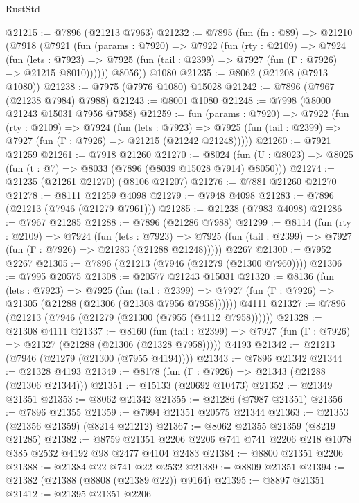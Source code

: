 \begin{lexlean}{RustStd}
\begin{coremodule}
@21215 := @7896 (@21213 @7963)
@21232 := @7895
    (fun (fn : @89) =>
    @21210
      (@7918
        (@7921
          (fun (params : @7920) =>
          @7922
            (fun (rty : @2109) =>
            @7924
              (fun (lets : @7923) =>
              @7925 (fun (tail : @2399) => @7927 (fun (Γ : @7926) => @21215 @8010))))))
        @8056))
    @1080
@21235 := @8062 (@21208 (@7913 @1080))
@21238 := @7975 (@7976 @1080) @15028
@21242 := @7896 (@7967 (@21238 @7984) @7988)
@21243 := @8001 @1080
@21248 := @7998 (@8000 @21243 @15031 @7956 @7958)
@21259 := fun (params : @7920) =>
  @7922
    (fun (rty : @2109) =>
    @7924
      (fun (lets : @7923) =>
      @7925 (fun (tail : @2399) => @7927 (fun (Γ : @7926) => @21215 (@21242 @21248)))))
@21260 := @7921 @21259
@21261 := @7918 @21260
@21270 := @8024
    (fun (U : @8023) => @8025 (fun (t : @7) => @8033 (@7896 (@8039 @15028 @7914) @8050)))
@21274 := @21235 (@21261 @21270) (@8106 @21207)
@21276 := @7881 @21260 @21270
@21278 := @8111 @21259 @4098
@21279 := @7948 @4098
@21283 := @7896 (@21213 (@7946 (@21279 @7961)))
@21285 := @21238 (@7983 @4098)
@21286 := @7967 @21285
@21288 := @7896 (@21286 @7988)
@21299 := @8114
    (fun (rty : @2109) =>
    @7924
      (fun (lets : @7923) =>
      @7925 (fun (tail : @2399) => @7927 (fun (Γ : @7926) => @21283 (@21288 @21248)))))
    @2267
@21300 := @7952 @2267
@21305 := @7896 (@21213 (@7946 (@21279 (@21300 @7960))))
@21306 := @7995 @20575
@21308 := @20577 @21243 @15031
@21320 := @8136
    (fun (lets : @7923) =>
    @7925
      (fun (tail : @2399) =>
      @7927 (fun (Γ : @7926) => @21305 (@21288 (@21306 (@21308 @7956 @7958))))))
    @4111
@21327 := @7896 (@21213 (@7946 (@21279 (@21300 (@7955 (@4112 @7958))))))
@21328 := @21308 @4111
@21337 := @8160
    (fun (tail : @2399) => @7927 (fun (Γ : @7926) => @21327 (@21288 (@21306 (@21328 @7958)))))
    @4193
@21342 := @21213 (@7946 (@21279 (@21300 (@7955 @4194))))
@21343 := @7896 @21342
@21344 := @21328 @4193
@21349 := @8178 (fun (Γ : @7926) => @21343 (@21288 (@21306 @21344)))
@21351 := @15133 (@20692 @10473)
@21352 := @21349 @21351
@21353 := @8062 @21342
@21355 := @21286 (@7987 @21351)
@21356 := @7896 @21355
@21359 := @7994 @21351 @20575 @21344
@21363 := @21353 (@21356 @21359) (@8214 @21212)
@21367 := @8062 @21355 @21359 (@8219 @21285)
@21382 := @8759 @21351 @2206 @2206 @741 @741 @2206 @218 @1078 @385 @2532 @4192 @98 @2477 @4104 @2483
@21384 := @8800 @21351 @2206
@21388 := @21384 @22 @741 @22 @2532
@21389 := @8809 @21351
@21394 := @21382 (@21388 (@8808 (@21389 @22)) @9164)
@21395 := @8897 @21351
@21412 := @21395
    @21351
    @2206

\end{coremodule}
\end{lexlean}
